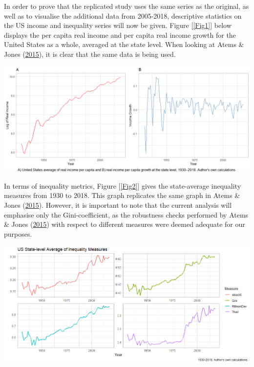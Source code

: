 \documentclass[11pt,preprint, authoryear]{elsarticle}
\let\origfigure\figure
\let\endorigfigure\endfigure
\renewenvironment{figure}[1][2] {
    \expandafter\origfigure\expandafter[H]
} {
    \endorigfigure
}
\numberwithin{equation}{section}
\numberwithin{figure}{section}
\numberwithin{table}{section}
\begin{document}
In order to prove that the replicated study uses the same series as the
original, as well as to visualise the additional data from 2005-2018,
descriptive statistics on the US income and inequality series will now
be given. Figure {[}\ref{Fig1}{]} below displays the per capita real
income and per capita real income growth for the United States as a
whole, averaged at the state level. When looking at Atems \& Jones
(\protect\hyperlink{ref-atems}{2015}), it is clear that the same data is
being used.

\begin{figure}[H]
\includegraphics[width=1\linewidth]{images/Fig1_US_Income_gridplot} \caption{\label{Fig1}}\label{fig:Fig1}
\end{figure}

In terms of inequality metrics, Figure {[}\ref{Fig2}{]} gives the
state-average inequality measures from 1930 to 2018. This graph
replicates the same graph in Atems \& Jones
(\protect\hyperlink{ref-atems}{2015}). However, it is important to note
that the current analysis will emphasise only the Gini-coefficient, as
the robustness checks performed by Atems \& Jones
(\protect\hyperlink{ref-atems}{2015}) with respect to different measures
were deemed adequate for our purposes.

\begin{figure}[H]
\includegraphics[width=1\linewidth]{images/Fig2_Inequality_Measures} \caption{\label{Fig2}}\label{fig:Fig2}
\end{figure}
\end{document}
